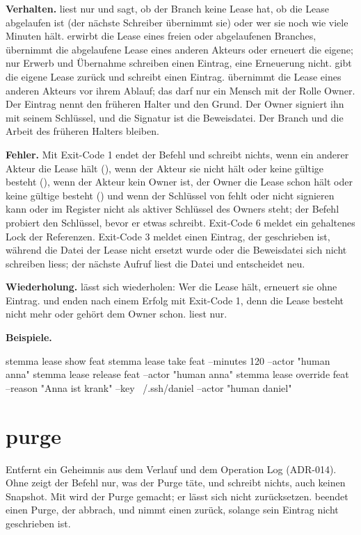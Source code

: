 {\bf Verhalten.}  liest nur und sagt, ob der Branch keine Lease hat, ob die Lease
abgelaufen ist (der nächste Schreiber übernimmt sie) oder wer sie noch wie viele Minuten hält.
 erwirbt die Lease eines freien oder abgelaufenen Branches, übernimmt die abgelaufene
Lease eines anderen Akteurs oder erneuert die eigene; nur Erwerb und Übernahme schreiben einen
Eintrag, eine Erneuerung nicht.  gibt die eigene Lease zurück und schreibt einen
Eintrag.  übernimmt die Lease eines anderen Akteurs vor ihrem Ablauf; das darf nur
ein Mensch mit der Rolle Owner. Der Eintrag nennt den früheren Halter und den Grund. Der Owner
signiert ihn mit seinem Schlüssel, und die Signatur ist die Beweisdatei. Der Branch und die Arbeit
des früheren Halters bleiben.

{\bf Fehler.} Mit Exit-Code 1 endet der Befehl und schreibt nichts, wenn ein anderer Akteur die
Lease hält (), wenn der Akteur sie nicht hält oder keine gültige besteht
(), wenn der Akteur kein Owner ist, der Owner die Lease schon hält oder keine
gültige besteht () und wenn der Schlüssel von  fehlt oder nicht
signieren kann oder im Register nicht als aktiver Schlüssel des Owners steht; der Befehl probiert
den Schlüssel, bevor er etwas schreibt. Exit-Code 6 meldet ein gehaltenes Lock der Referenzen.
Exit-Code 3 meldet einen Eintrag, der geschrieben ist, während die Datei der Lease nicht ersetzt
wurde oder die Beweisdatei sich nicht schreiben liess; der nächste Aufruf liest die Datei und
entscheidet neu.

{\bf Wiederholung.}  lässt sich wiederholen: Wer die Lease hält, erneuert sie ohne
Eintrag.  und  enden nach einem Erfolg mit Exit-Code 1, denn die
Lease besteht nicht mehr oder gehört dem Owner schon.  liest nur.

{\bf Beispiele.}

\starttyping
stemma lease show feat
stemma lease take feat --minutes 120 --actor "human anna"
stemma lease release feat --actor "human anna"
stemma lease override feat --reason "Anna ist krank" --key ~/.ssh/daniel --actor "human daniel"
\stoptyping

\section{purge}

Entfernt ein Geheimnis aus dem Verlauf und dem Operation Log (ADR-014). Ohne 
zeigt der Befehl nur, was der Purge täte, und schreibt nichts, auch keinen Snapshot.
Mit  wird der Purge gemacht; er lässt sich nicht zurücksetzen.
 beendet einen Purge, der abbrach, und  nimmt einen zurück,
solange sein Eintrag nicht geschrieben ist.


